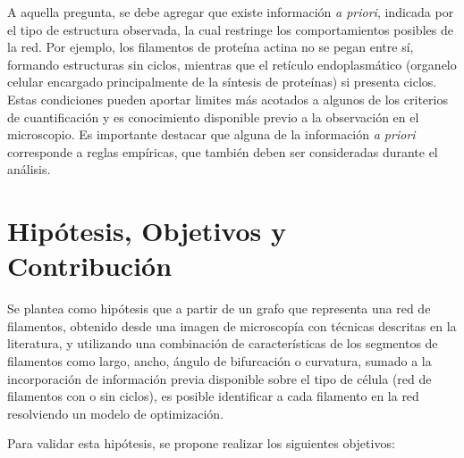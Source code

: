 \documentclass{article}
\begin{document}

A aquella pregunta, se debe agregar que existe informaci\'on \textit{a priori}, indicada por el tipo de estructura observada, la cual restringe los comportamientos posibles de la red. Por ejemplo, los filamentos de prote\'ina actina no se pegan entre s\'i, formando estructuras sin ciclos, mientras que el ret\'iculo endoplasm\'atico (organelo celular encargado principalmente de la s\'intesis de prote\'inas) si presenta ciclos. Estas condiciones pueden aportar limites m\'as acotados a algunos de los criterios de cuantificaci\'on y es conocimiento disponible previo a la observaci\'on en el microscopio. Es importante destacar que alguna de la informaci\'on {\it a priori} corresponde a reglas emp\'iricas, que tambi\'en deben ser consideradas durante el an\'alisis.


\section{Hipótesis, Objetivos y Contribuci\'on}
\label{hipotesis}
Se plantea como hip\'otesis que a partir de un grafo que representa una red de filamentos, obtenido desde una imagen de microscop\'ia con t\'ecnicas descritas en la literatura, y utilizando una combinaci\'on de caracter\'isticas de los segmentos de filamentos como largo, ancho, \'angulo de bifurcaci\'on o curvatura, sumado a la incorporaci\'on de informaci\'on previa disponible sobre el tipo de c\'elula (red de filamentos con o sin ciclos), es posible identificar a cada filamento en la red resolviendo un modelo de optimizaci\'on.

Para validar esta hip\'otesis, se propone realizar los siguientes objetivos:
\end{document}
